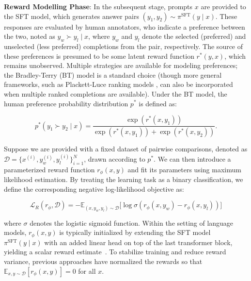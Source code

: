 \textbf{Reward Modelling Phase}: In the subsequent stage, prompts $x$ are provided to the SFT model, which generates answer pairs $(y_1, y_2)\sim \pi^\text{SFT}(y \mid x)$. These responses are evaluated by human annotators, who indicate a preference between the two, noted as $y_w\succ y_l \mid x$, where $y_w$ and $y_l$ denote the selected (preferred) and unselected (less preferred) completions from the pair, respectively. The source of these preferences is presumed to be some latent reward function $r^*(y, x)$, which remains unobserved. Multiple strategies are available for modeling preferences; the Bradley-Terry (BT) \cite{bradley1952rankanalysis} model is a standard choice (though more general frameworks, such as Plackett-Luce ranking models \citep{plackett1975analysis, luce2012individual}, can also be incorporated when multiple ranked completions are available). Under the BT model, the human preference probability distribution $p^*$ is defined as:

\begin{equation}\label{eq:bradley-terry}
    p^*(y_1\succ y_2 \mid x)=\frac{\exp\left(r^*(x, y_1)\right)}{\exp\left(r^*(x, y_1)\right) + \exp\left(r^*(x, y_2)\right)}.
\end{equation}

Suppose we are provided with a fixed dataset of pairwise comparisons, denoted as $\mathcal{D}=\bigl\{x^{(i)}, y_w^{(i)}, y_l^{(i)}\bigr\}_{i=1}^N$, drawn according to $p^*$. We can then introduce a parameterized reward function $r_{\phi}(x, y)$ and fit its parameters using maximum likelihood estimation. By treating the learning task as a binary classification, we define the corresponding negative log-likelihood objective as:

\begin{equation}\label{eq:reward_model}
    \mathcal{L}_R(r_{\phi}, \mathcal{D}) = -\mathbb{E}_{(x, y_w, y_l)\sim \mathcal{D}}\bigl[\log \sigma(r_{\phi}(x, y_w)- r_{\phi}(x, y_l))\bigr]
\end{equation}

where $\sigma$ denotes the logistic sigmoid function. Within the setting of language models, $r_{\phi}(x, y)$ is typically initialized by extending the SFT model $\pi^\text{SFT}(y \mid x)$ with an added linear head on top of the last transformer block, yielding a scalar reward estimate~\cite{ziegler2020finetuning}. To stabilize training and reduce reward variance, previous approaches have normalized the rewards so that $\mathbb{E}_{x,y\sim \mathcal{D}}\left[r_\phi(x, y)\right] = 0$ for all $x$.


